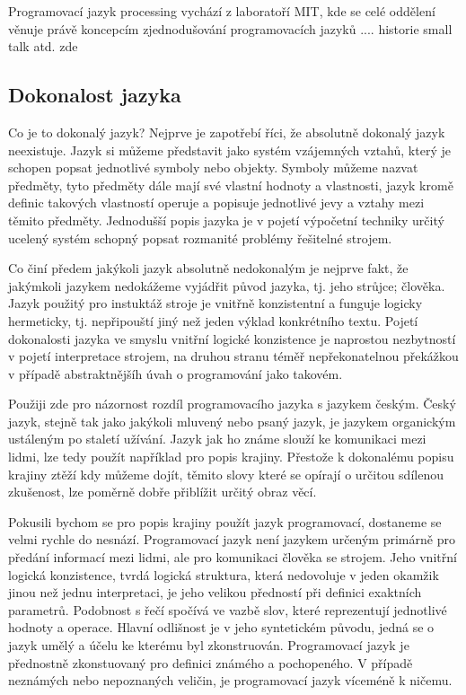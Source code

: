 \documentclass[11pt]{article}
\begin{document}
Programovací jazyk processing vychází z laboratoří MIT, kde se celé oddělení věnuje právě koncepcím zjednodušování programovacích jazyků .... historie small talk atd. zde


\subsection{Dokonalost jazyka}

Co je to dokonalý jazyk? Nejprve je zapotřebí říci, že absolutně dokonalý jazyk neexistuje. Jazyk si můžeme představit jako systém vzájemných vztahů, který je schopen popsat jednotlivé symboly nebo objekty. Symboly můžeme nazvat předměty, tyto předměty dále mají své vlastní hodnoty a vlastnosti, jazyk kromě definic takových vlastností operuje a popisuje jednotlivé jevy a vztahy mezi těmito předměty. Jednodušší popis jazyka je v pojetí výpočetní techniky určitý ucelený systém schopný popsat rozmanité problémy řešitelné strojem.

Co činí předem jakýkoli jazyk absolutně nedokonalým je nejprve fakt, že jakýmkoli jazykem nedokážeme vyjádřit původ jazyka, tj. jeho strůjce; člověka. Jazyk použitý pro instuktáž stroje je vnitřně konzistentní a funguje logicky hermeticky, tj. nepřipouští jiný než jeden výklad konkrétního textu. Pojetí dokonalosti jazyka ve smyslu vnitřní logické konzistence je naprostou nezbytností v pojetí interpretace strojem, na druhou stranu téměř nepřekonatelnou překážkou v případě abstraktnějšíh úvah o programování jako takovém.

Použiji zde pro názornost rozdíl programovacího jazyka s jazykem českým. Český jazyk, stejně tak jako jakýkoli mluvený nebo psaný jazyk, je jazykem organickým ustáleným po staletí užívání. Jazyk jak ho známe slouží ke komunikaci mezi lidmi, lze tedy použít například pro popis krajiny. Přestože k dokonalému popisu krajiny ztěží kdy můžeme dojít, těmito slovy které se opírají o určitou sdílenou zkušenost, lze poměrně dobře přiblížit určitý obraz věcí.

Pokusili bychom se pro popis krajiny použít jazyk programovací, dostaneme se velmi rychle do nesnází. Programovací jazyk není jazykem určeným primárně pro předání informací mezi lidmi, ale pro komunikaci člověka se strojem. Jeho vnitřní logická konzistence, tvrdá logická struktura, která nedovoluje v jeden okamžik jinou než jednu interpretaci, je jeho velikou předností při definici exaktních parametrů. Podobnost s řečí spočívá ve vazbě slov, které reprezentují jednotlivé hodnoty a operace. Hlavní odlišnost je v jeho syntetickém původu, jedná se o jazyk umělý a účelu ke kterému byl zkonstruován. Programovací jazyk je přednostně zkonstuovaný pro definici známého a pochopeného. V případě neznámých nebo nepoznaných veličin, je programovací jazyk víceméně k ničemu. 
\end{document}
